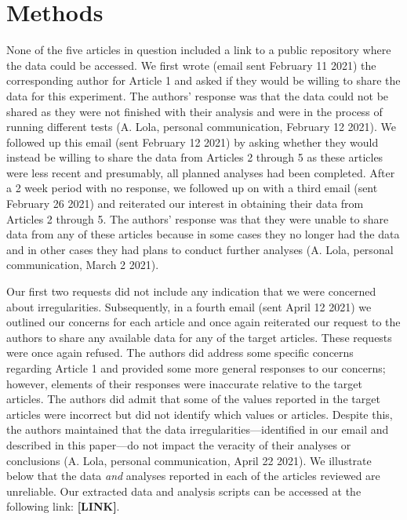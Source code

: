 \documentclass[
  english,
  man,floatsintext]{apa7}
\begin{document}
\hypertarget{methods}{%
\section{Methods}\label{methods}}

None of the five articles in question included a link to a public repository where the data could be accessed. We first wrote (email sent February 11 2021) the corresponding author for Article 1 and asked if they would be willing to share the data for this experiment. The authors' response was that the data could not be shared as they were not finished with their analysis and were in the process of running different tests (A. Lola, personal communication, February 12 2021). We followed up this email (sent February 12 2021) by asking whether they would instead be willing to share the data from Articles 2 through 5 as these articles were less recent and presumably, all planned analyses had been completed. After a 2 week period with no response, we followed up on with a third email (sent February 26 2021) and reiterated our interest in obtaining their data from Articles 2 through 5. The authors' response was that they were unable to share data from any of these articles because in some cases they no longer had the data and in other cases they had plans to conduct further analyses (A. Lola, personal communication, March 2 2021).

Our first two requests did not include any indication that we were concerned about irregularities. Subsequently, in a fourth email (sent April 12 2021) we outlined our concerns for each article and once again reiterated our request to the authors to share any available data for any of the target articles. These requests were once again refused. The authors did address some specific concerns regarding Article 1 and provided some more general responses to our concerns; however, elements of their responses were inaccurate relative to the target articles. The authors did admit that some of the values reported in the target articles were incorrect but did not identify which values or articles. Despite this, the authors maintained that the data irregularities---identified in our email and described in this paper---do not impact the veracity of their analyses or conclusions (A. Lola, personal communication, April 22 2021). We illustrate below that the data \emph{and} analyses reported in each of the articles reviewed are unreliable. Our extracted data and analysis scripts can be accessed at the following link: \textbf{{[}LINK{]}}.
\end{document}
